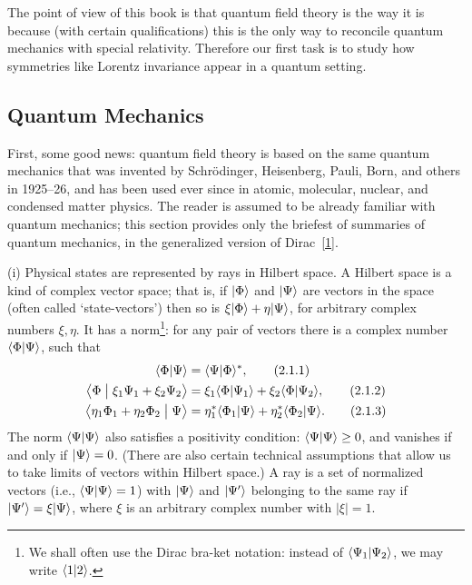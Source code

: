 
The point of view of this book is that quantum field theory is the way
it is because (with certain qualifications) this is the only way to reconcile
quantum mechanics with special relativity. Therefore our first task is
to study how symmetries like Lorentz invariance appear in a quantum
setting.

\subsection{Quantum Mechanics}

First, some good news: quantum field theory is based on the same
quantum mechanics that was invented by Schr\"odinger, Heisenberg, Pauli,
Born, and others in 1925--26, and has been used ever since in atomic,
molecular, nuclear, and condensed matter physics. The reader is assumed
to be already familiar with quantum mechanics; this section provides
only the briefest of summaries of quantum mechanics, in the generalized
version of Dirac~\hyperref[ref:2.1]{[1]}.

\noindent
(i) Physical states are represented by rays in Hilbert space. A Hilbert
space is a kind of complex vector space; that is, if $\lvert \Phi\rangle$ and
$\lvert \Psi\rangle$ are vectors in the space (often called `state-vectors') then
so is $\xi\lvert \Phi\rangle+\eta\lvert \Psi\rangle$, for arbitrary complex numbers
$\xi,\eta$. It has a norm\footnote{We shall often use the Dirac bra-ket
notation: instead of $\langle \Psi_1 | \Psi_2\rangle$, we may write
$\langle 1 | 2\rangle$.}: for any pair of
vectors there is a complex
number $\langle \Phi | \Psi\rangle$, such that
\begin{align}
  \langle \Phi | \Psi\rangle &= \langle \Psi | \Phi\rangle^{*},
  \tag{2.1.1}\label{eq:2.1.1}\\
  \bigl\langle \Phi \bigm| \xi_1\Psi_1+\xi_2\Psi_2\bigr\rangle
    &= \xi_1\langle \Phi | \Psi_1\rangle+\xi_2\langle \Phi | \Psi_2\rangle,
  \tag{2.1.2}\label{eq:2.1.2}\\
  \bigl\langle \eta_1\Phi_1+\eta_2\Phi_2 \bigm| \Psi\bigr\rangle
    &= \eta_1^{*}\langle \Phi_1 | \Psi\rangle
      +\eta_2^{*}\langle \Phi_2 | \Psi\rangle.
  \tag{2.1.3}\label{eq:2.1.3}
\end{align}
The norm $\langle \Psi | \Psi\rangle$ also satisfies a positivity condition:
$\langle \Psi | \Psi\rangle\geq 0$, and vanishes if and only if
$\lvert \Psi\rangle=0$. (There are also certain technical assumptions that allow
us to take limits of vectors within Hilbert space.) A ray is a set of
normalized vectors (i.e., $\langle \Psi | \Psi\rangle=1$) with $\lvert \Psi\rangle$ and
$\lvert \Psi'\rangle$ belonging to the same ray if
$\lvert \Psi'\rangle=\xi\lvert \Psi\rangle$, where $\xi$ is an arbitrary complex number
with $|\xi|=1$.

